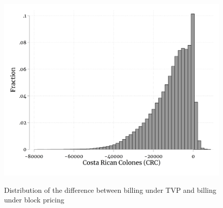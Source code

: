\begin{figure}[ht]
  \caption{Distribution of the difference between billing under TVP and billing under block pricing}\label{fig:billing}
  \begin{center}
  {\includegraphics[width=1\textwidth]{./figures/billing.png}}
  \end{center}
\end{figure}

\FloatBarrier
